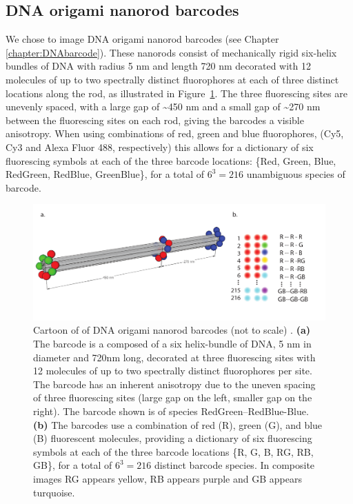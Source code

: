 \subsection{DNA origami nanorod barcodes}
We chose to image DNA origami nanorod barcodes (see Chapter \ref{chapter:DNAbarcode}). These nanorods consist of mechanically rigid six-helix bundles of DNA with radius 5 nm and length 720 nm decorated with  12 molecules of up to two spectrally distinct fluorophores at each of three distinct locations along the rod, as illustrated in Figure~\ref{fig:cartoonBarcode}. The three fluorescing sites are unevenly spaced, with a large gap of \textasciitilde 450 nm and a small gap of \textasciitilde 270 nm  between the fluorescing sites on each rod, giving the barcodes a visible anisotropy. When using combinations of red, green and blue fluorophores, (Cy5, Cy3 and Alexa Fluor 488, respectively) this allows for a dictionary of six fluorescing symbols at each of the three barcode locations: \{Red, Green, Blue, RedGreen, RedBlue, GreenBlue\}, for a total of $6^{3}=216$  unambiguous species of barcode.

\begin{figure}[htbp]
\begin{center}
	\includegraphics[width=\textwidth]{figures/theoryCartoonBarcode}
	\caption{Cartoon of of DNA origami nanorod barcodes (not to scale) . \textbf{(a)} The barcode is a composed of a six  helix-bundle of DNA, 5 nm in diameter and 720nm long, decorated at three fluorescing sites with 12 molecules of up to two  spectrally distinct fluorophores per site. The barcode has an inherent anisotropy due to the uneven spacing of three fluorescing sites (large gap on the left, smaller gap on the right). The barcode shown is of species RedGreen--RedBlue-Blue. \textbf{(b)} The barcodes use a combination of red (R), green (G), and blue (B) fluorescent molecules, providing a dictionary of six fluorescing symbols at each of the three barcode locations \{R, G, B, RG, RB, GB\}, for a total of $6^{3}=216$ distinct barcode species. In composite images RG appears yellow, RB appears purple and GB appears turquoise.   \label{fig:cartoonBarcode}}
\end{center}	
\end{figure}

